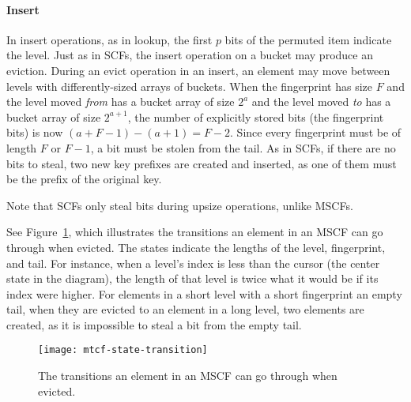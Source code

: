 \documentclass[letterpaper,twocolumn,10pt]{article}
\newcommand{\TCF}{SCF}
\newcommand{\MTCF}{MSCF}
\newcommand{\TCF}{TCF}
\newcommand{\MTCF}{MTCF}
\begin{document}


\paragraph{Insert}
In insert operations, as in lookup, the first $p$ bits of the permuted item indicate the level. %
Just as in \TCF{}s, the insert operation on a bucket may produce an eviction. %
During an evict operation in an insert, an element may move between levels with differently-sized arrays of buckets.
When the fingerprint has size $F$ and the level moved {\em from} has a bucket array of size $2^a$ and the level moved {\em to} has a bucket array of size $2^{a+1}$, the number of explicitly stored bits (the fingerprint bits) is now $(a + F - 1) - (a+1) = F - 2$.
Since every fingerprint must be of length $F$ or $F-1$, a bit must be stolen from the tail. %
As in \TCF{}s, if there are no bits to steal, two new key prefixes are created and inserted, as one of them must be the prefix of the original key. %

Note that \TCF{}s only steal bits during upsize operations, unlike \MTCF{}s.

See Figure~\ref{mtcf-state-transition}, which illustrates the transitions an element in an \MTCF{} can go through when evicted.
The states indicate the lengths of the level, fingerprint, and tail.
For instance, when a level's index is less than the cursor (the center state in the diagram), the length of that level is twice what it would be if its index were higher.
For elements in a short level with a short fingerprint an empty tail, when they are evicted to an element in a long level, two elements are created, as it is impossible to steal a bit from the empty tail.


\begin{figure}[b!]
  \texttt{[image: mtcf-state-transition]}
\caption{\label{mtcf-state-transition}
The transitions an element in an \MTCF{} can go through when evicted.
}
\end{figure}
\end{document}
